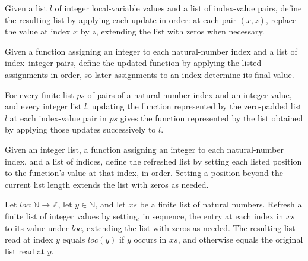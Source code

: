 \begin{definition}
\label{Light.setLocals}
\leanok
{}
Given a list $l$ of integer local-variable values and a list of index-value pairs,
define the resulting list by applying each update in order: at each pair $(x,z)$,
replace the value at index $x$ by $z$, extending the list with zeros when necessary.
\end{definition}

\begin{definition}
\label{Light.updateLocals}
\leanok
Given a function assigning an integer to each natural-number index and a list of
index–integer pairs, define the updated function by applying the listed assignments in
order, so later assignments to an index determine its final value.
\end{definition}

\begin{theorem}
\label{Light.updateLocals_frame}
\leanok
{}
For every finite list $ps$ of pairs of a natural-number index and an integer value, and
every integer list $l$, updating the function represented by the zero-padded list $l$ at
each index-value pair in $ps$ gives the function represented by the list obtained by
applying those updates successively to $l$.
\end{theorem}

\begin{definition}
\label{Light.refreshLocals}
\leanok
{}
Given an integer list, a function assigning an integer to each natural-number index, and
a list of indices, define the refreshed list by setting each listed position to the
function’s value at that index, in order. Setting a position beyond the current list
length extends the list with zeros as needed.
\end{definition}

\begin{theorem}
\label{Light.frame_refreshLocals}
\leanok
{}
Let $loc:\mathbb N\to\mathbb Z$, let $y\in\mathbb N$, and let $xs$ be a finite list of
natural numbers. Refresh a finite list of integer values by setting, in sequence, the
entry at each index in $xs$ to its value under $loc$, extending the list with zeros as
needed. The resulting list read at index $y$ equals $loc(y)$ if $y$ occurs in $xs$, and
otherwise equals the original list read at $y$.
\end{theorem}

